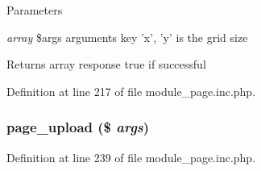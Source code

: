\begin{DoxyParams}{Parameters}
\item[{\em array}]\$args arguments key 'x', 'y' is the grid size \end{DoxyParams}
\begin{DoxyReturn}{Returns}
array response true if successful 
\end{DoxyReturn}


Definition at line 217 of file module\_\-page.inc.php.

\hypertarget{module__page_8inc_8php_a0b7e8997d0fe2f4725a68e158f2d0fb5}{
\subsubsection[{page\_\-upload}]{\setlength{\rightskip}{0pt plus 5cm}page\_\-upload (\$ {\em args})}}
\label{module__page_8inc_8php_a0b7e8997d0fe2f4725a68e158f2d0fb5}


Definition at line 239 of file module\_\-page.inc.php.


